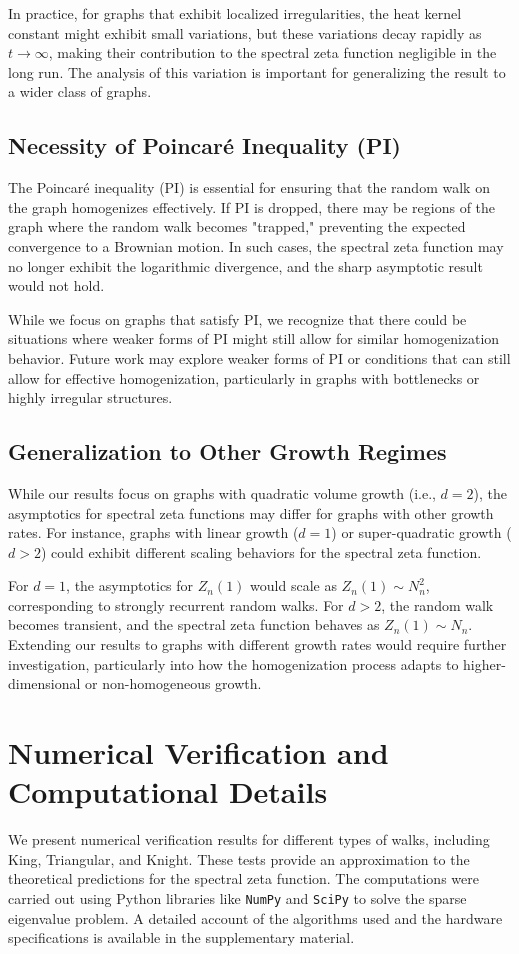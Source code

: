 \documentclass{article}
\numberwithin{equation}{section}
\theoremstyle{definition}
\theoremstyle{remark}
\begin{document}
In practice, for graphs that exhibit localized irregularities, the heat kernel constant might exhibit small variations, but these variations decay rapidly as $ t \to \infty $, making their contribution to the spectral zeta function negligible in the long run. The analysis of this variation is important for generalizing the result to a wider class of graphs.

\subsection{Necessity of Poincaré Inequality (PI)}
The Poincaré inequality (PI) is essential for ensuring that the random walk on the graph homogenizes effectively. If PI is dropped, there may be regions of the graph where the random walk becomes "trapped," preventing the expected convergence to a Brownian motion. In such cases, the spectral zeta function may no longer exhibit the logarithmic divergence, and the sharp asymptotic result would not hold.

While we focus on graphs that satisfy PI, we recognize that there could be situations where weaker forms of PI might still allow for similar homogenization behavior. Future work may explore weaker forms of PI or conditions that can still allow for effective homogenization, particularly in graphs with bottlenecks or highly irregular structures.

\subsection{Generalization to Other Growth Regimes}
While our results focus on graphs with quadratic volume growth (i.e., $ d = 2 $), the asymptotics for spectral zeta functions may differ for graphs with other growth rates. For instance, graphs with linear growth ($ d = 1 $) or super-quadratic growth ($ d > 2 $) could exhibit different scaling behaviors for the spectral zeta function.

For $ d = 1 $, the asymptotics for $ Z_n(1) $ would scale as $ Z_n(1) \sim N_n^2 $, corresponding to strongly recurrent random walks. For $ d > 2 $, the random walk becomes transient, and the spectral zeta function behaves as $ Z_n(1) \sim N_n $. Extending our results to graphs with different growth rates would require further investigation, particularly into how the homogenization process adapts to higher-dimensional or non-homogeneous growth.

\section{Numerical Verification and Computational Details}
We present numerical verification results for different types of walks, including King, Triangular, and Knight. These tests provide an approximation to the theoretical predictions for the spectral zeta function. The computations were carried out using Python libraries like \texttt{NumPy} and \texttt{SciPy} to solve the sparse eigenvalue problem. A detailed account of the algorithms used and the hardware specifications is available in the supplementary material.
\end{document}
